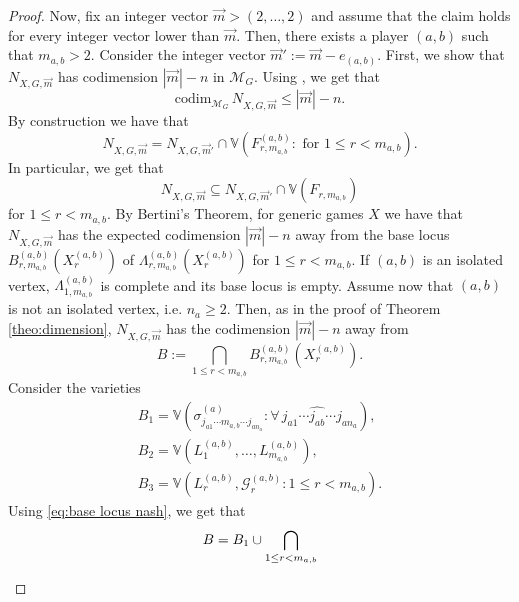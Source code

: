 \documentclass[11pt]{amsart}
\numberwithin{equation}{section}
\theoremstyle{plain}
\numberwithin{theorem}{section}
\theoremstyle{definition}
\begin{document}
\begin{proof}
Now, fix an integer vector $\overrightarrow{m}>(2,\ldots,2)$ and assume that the claim holds for every integer vector lower than  $\overrightarrow{m}$. Then, there exists a player $(a,b)$ such that $m_{a,b}>2$. Consider the integer vector $\overrightarrow{m}':=\overrightarrow{m}-e_{(a,b)}$. First, we show that $N_{X,G,\overrightarrow{m}}$ has codimension $|\overrightarrow{m}|-n$ in $\mathcal{M}_G$. Using \cite[Proposition 12.2]{harris2013algebraic}, we get that
\begin{equation}\label{eq: codim induction}
\mathrm{codim}_{\mathcal{M}_G}\,N_{X,G,\overrightarrow{m}}\leq |\overrightarrow{m}|-n.
\end{equation}
 By construction we have that 
\begin{equation}\label{eq:inclusion induction}
N_{X,G,\overrightarrow{m}} = N_{X,G,\overrightarrow{m}'}\cap \mathbb{V}\left(F^{(a,b)}_{r,m_{a,b}}:\text{ for } 1\leq r< m_{a,b}\right).
\end{equation}
In particular, we get that 
\[
N_{X,G,\overrightarrow{m}} \subseteq  N_{X,G,\overrightarrow{m}'}\cap \mathbb{V}(F_{r,m_{a,b}})
\]
for $1\leq r<m_{a,b}$.
By Bertini's Theorem, for generic games $X$ we have that $N_{X,G,\overrightarrow{m}}$ has the expected codimension $|\overrightarrow{m}|-n$  away from the base locus $B_{r,m_{a,b}}^{(a,b)}(X_{r}^{(a,b)})$ of  $\Lambda_{r,m_{a,b}}^{(a,b)}(X_{r}^{(a,b)})$ for $1\leq r<m_{a,b}$. If $(a,b)$ is an isolated vertex, $\Lambda_{1,m_{a,b}}^{(a,b)}$ is complete and its base locus is empty. Assume now that $(a,b)$ is not an isolated vertex, i.e. $n_a\geq 2$.
Then, as in the proof of Theorem \ref{theo:dimension}, $N_{X,G,\overrightarrow{m}}$ has the codimension $|\overrightarrow{m}|-n$  away from
\begin{equation}\label{eq:def B}
B:= \bigcap_{1\leq r<m_{a,b}}B_{r,m_{a,b}}^{(a,b)}(X_{r}^{(a,b)}).
\end{equation}
Consider the varieties
\[
\begin{array}{l}
\displaystyle B_1=  \mathbb{V}(\sigma^{(a)}_{j_{a1}\cdots m_{a,b}\cdots j_{an_a}} :\forall\, j_{a1}\cdots \widehat{j_{ab}}\cdots j_{an_a}), \\
\displaystyle
B_2 = \mathbb{V}(L_1^{(a,b)},\ldots,L_{m_{a,b}}^{(a,b)}),\\
\displaystyle
B_3 = \mathbb{V}(L_r^{(a,b)},\mathcal G_{r}^{(a,b)}:1\leq r<m_{a,b}).
\end{array}
\]
Using \eqref{eq:base locus nash}, we get that 
\[\begin{array}{c}
\vspace*{1mm}\displaystyle B = B_1\cup \bigcap_{1\leq r<m_{a,b}} 

\end{array}\]
\end{proof}
\end{document}
